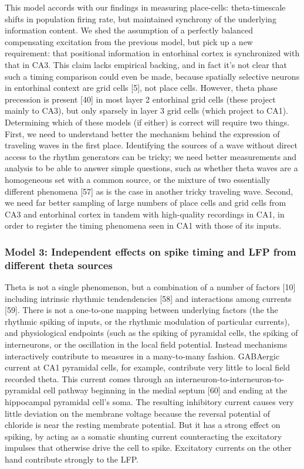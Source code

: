 \documentclass[]{article}
\begin{document}
This model accords with our findings in measuring place-cells:
theta-timescale shifts in population firing rate, but maintained
synchrony of the underlying information content. We shed the assumption
of a perfectly balanced compensating excitation from the previous model,
but pick up a new requirement: that positional information in entorhinal
cortex is synchronized with that in CA3. This claim lacks empirical
backing, and in fact it's not clear that such a timing comparison could
even be made, because spatially selective neurons in entorhinal context
are grid cells {[}5{]}, not place cells. However, theta phase precession
is present {[}40{]} in most layer 2 entorhinal grid cells (these project
mainly to CA3), but only sparsely in layer 3 grid cells (which project
to CA1). Determining which of these models (if either) is correct will
require two things. First, we need to understand better the mechanism
behind the expression of traveling waves in the first place. Identifying
the sources of a wave without direct access to the rhythm generators can
be tricky; we need better measurements and analysis to be able to answer
simple questions, such as whether theta waves are a homogeneous set with
a common source, or the mixture of two essentially different phenomena
{[}57{]} as is the case in another tricky traveling wave. Second, we
need far better sampling of large numbers of place cells and grid cells
from CA3 and entorhinal cortex in tandem with high-quality recordings in
CA1, in order to register the timing phenomena seen in CA1 with those of
its inputs.

\subsubsection{Model 3: Independent effects on spike timing and LFP from
different theta sources}

Theta is not a single phenomenon, but a combination of a number of
factors {[}10{]} including intrinsic rhythmic tendendencies {[}58{]} and
interactions among currents {[}59{]}. There is not a one-to-one mapping
between underlying factors (the the rhythmic spiking of inputs, or the
rhythmic modulation of particular currents), and physiological endpoints
(such as the spiking of pyramidal cells, the spiking of interneurons, or
the oscillation in the local field potential. Instead mechanisms
interactively contribute to measures in a many-to-many fashion.
GABAergic current at CA1 pyramidal cells, for example, contribute very
little to local field recorded theta. This current comes through an
interneuron-to-interneuron-to-pyramidal cell pathway beginning in the
medial septum {[}60{]} and ending at the hippocampal pyramidal cell's
soma. The resulting inhibitory current causes very little deviation on
the membrane voltage because the reversal potential of chloride is near
the resting membrate potential. But it has a strong effect on spiking,
by acting as a somatic shunting current counteracting the excitatory
impulses that otherwise drive the cell to spike. Excitatory currents on
the other hand contribute strongly to the LFP.
\end{document}

